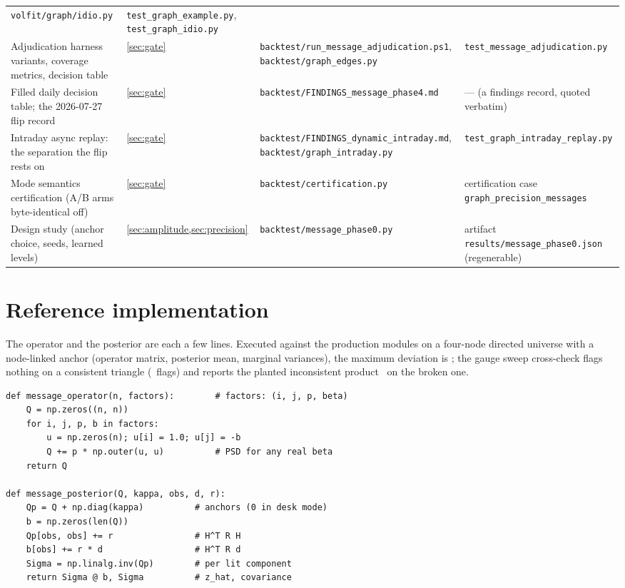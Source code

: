 \documentclass[11pt]{article}
\begin{document}
\begin{longtable}{@{}p{}p{}p{}p{}@{}}
\nolinkurl{volfit/graph/idio.py} &
\nolinkurl{test_graph_example.py},
\nolinkurl{test_graph_idio.py}\\
Adjudication harness variants, coverage metrics, decision table &
\cref{sec:gate} &
\nolinkurl{backtest/run_message_adjudication.ps1},
\nolinkurl{backtest/graph_edges.py} &
\nolinkurl{test_message_adjudication.py}\\
Filled daily decision table; the 2026-07-27 flip record &
\cref{sec:gate} &
\nolinkurl{backtest/FINDINGS_message_phase4.md} &
--- (a findings record, quoted verbatim)\\
Intraday async replay: the separation the flip rests on &
\cref{sec:gate} &
\nolinkurl{backtest/FINDINGS_dynamic_intraday.md},
\nolinkurl{backtest/graph_intraday.py} &
\nolinkurl{test_graph_intraday_replay.py}\\
Mode semantics certification (A/B arms byte-identical off) &
\cref{sec:gate} &
\nolinkurl{backtest/certification.py} &
certification case\newline
\texttt{graph\_\allowbreak precision\_\allowbreak messages}\\
Design study (anchor choice, seeds, learned levels) &
\cref{sec:amplitude,sec:precision} &
\nolinkurl{backtest/message_phase0.py} &
artifact \nolinkurl{results/message_phase0.json} (regenerable)\\
\bottomrule
\end{longtable}
\endgroup

\section{Reference implementation}
\label{app:ref}

The operator and the posterior are each a few lines.  Executed against
the production modules on a four-node directed universe with a
node-linked anchor (operator matrix, posterior mean, marginal
variances), the maximum deviation is \gmrefagree; the gauge sweep
cross-check flags nothing on a consistent triangle
(\gmcycleflags\ flags) and reports the planted inconsistent product
\gmcyclebad\ on the broken one.

\begin{lstlisting}[caption={The pairwise operator and the
information-form solve (verified against \texttt{graph/message.py} and
\texttt{graph/message\_posterior.py}; agreement stated above).}]
def message_operator(n, factors):        # factors: (i, j, p, beta)
    Q = np.zeros((n, n))
    for i, j, p, b in factors:
        u = np.zeros(n); u[i] = 1.0; u[j] = -b
        Q += p * np.outer(u, u)          # PSD for any real beta
    return Q

def message_posterior(Q, kappa, obs, d, r):
    Qp = Q + np.diag(kappa)          # anchors (0 in desk mode)
    b = np.zeros(len(Q))
    Qp[obs, obs] += r                # H^T R H
    b[obs] += r * d                  # H^T R d
    Sigma = np.linalg.inv(Qp)        # per lit component
    return Sigma @ b, Sigma          # z_hat, covariance
\end{lstlisting}
\end{document}
